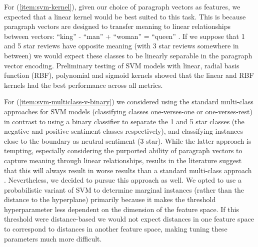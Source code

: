 \documentclass[11pt]{article}
\begin{document}
For (\ref{item:svm-kernel}), given our choice of paragraph vectors as features, we expected that a linear kernel would be best suited to this task. This is because paragraph vectors are designed to transfer meaning to linear relationships between vectors: ``king'' - ``man'' + ``woman'' = ``queen'' \cite{le_distributed_2014}. If we suppose that 1 and 5 star reviews have opposite meaning (with 3 star reviews somewhere in between) we would expect these classes to be linearly separable in the paragraph vector encoding. Preliminary testing of SVM models with linear, radial basis function (RBF), polynomial and sigmoid kernels showed that the linear and RBF kernels had the best performance across all metrics.

For (\ref{item:svm-multiclass-v-binary}) we considered using the standard multi-class approaches for SVM models (classifying classes one-verses-one or one-verses-rest) in contrast to using a binary classifier to separate the 1 and 5 star classes (the negative and positive sentiment classes respectively), and classifying instances close to the boundary as neutral sentiment (3 star). While the latter approach is tempting, especially considering the purported ability of paragraph vectors to capture meaning through linear relationships, results in the literature suggest that this will always result in worse results than a standard multi-class approach \cite{koppel_importance_2006}. Nevertheless, we decided to pursue this approach as well. We opted to use a probabilistic variant of SVM to determine marginal instances (rather than the distance to the hyperplane) primarily because it makes the threshold hyperparameter less dependent on the dimension of the feature space. If this threshold were distance-based we would not expect distances in one feature space to correspond to distances in another feature space, making tuning these parameters much more difficult.
\end{document}
